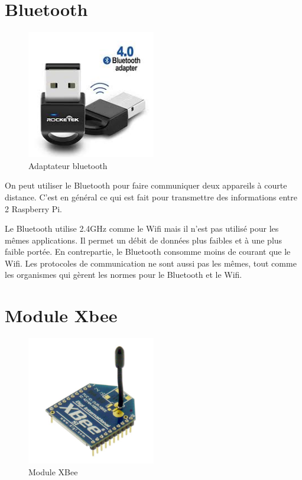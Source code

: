 \documentclass[a4paper, 11pt]{report}
\begin{document}
\section{Bluetooth}

\begin{figure}[h!]
\begin{centering}
\includegraphics[width=0.5\textwidth]{images/dongleBluetooth.jpeg}
\caption{Adaptateur bluetooth}
\par\end{centering}
\end{figure}

On peut utiliser le Bluetooth pour faire communiquer deux appareils à courte distance. C'est en général ce qui est fait pour transmettre des informations entre 2 Raspberry Pi.

Le Bluetooth utilise 2.4GHz comme le Wifi mais il n'est pas utilisé pour les mêmes applications. Il permet un débit de données plus faibles et à une plus faible portée. En contrepartie, le Bluetooth consomme moins de courant que le Wifi. Les protocoles de communication ne sont aussi pas les mêmes, tout comme les organismes qui gèrent les normes pour le Bluetooth et le Wifi.

\section{Module Xbee}

\begin{figure}[h!]
\begin{centering}
\includegraphics[width=0.5\textwidth]{images/XBee.jpg}
\caption{Module XBee}
\par\end{centering}
\end{figure}
\end{document}
